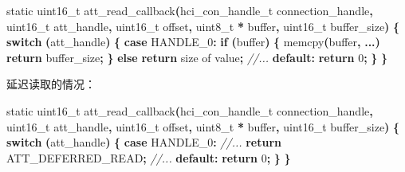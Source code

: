 \documentclass[
  12pt,
]{book}
\newenvironment{Shaded}{\begin{snugshade}}{\end{snugshade}}
\newcommand{\CommentTok}[1]{\textcolor[rgb]{0.56,0.35,0.01}{\textit{#1}}}
\newcommand{\ControlFlowTok}[1]{\textcolor[rgb]{0.13,0.29,0.53}{\textbf{#1}}}
\newcommand{\DataTypeTok}[1]{\textcolor[rgb]{0.13,0.29,0.53}{#1}}
\newcommand{\DecValTok}[1]{\textcolor[rgb]{0.00,0.00,0.81}{#1}}
\newcommand{\NormalTok}[1]{#1}
\newcommand{\OperatorTok}[1]{\textcolor[rgb]{0.81,0.36,0.00}{\textbf{#1}}}
\begin{document}
\begin{Shaded}
\begin{Highlighting}[]
\DataTypeTok{static} \DataTypeTok{uint16\_t}\NormalTok{ att\_read\_callback}\OperatorTok{(}\NormalTok{hci\_con\_handle\_t connection\_handle}\OperatorTok{,}
  \DataTypeTok{uint16\_t}\NormalTok{ att\_handle}\OperatorTok{,} \DataTypeTok{uint16\_t}\NormalTok{ offset}\OperatorTok{,}
  \DataTypeTok{uint8\_t} \OperatorTok{*}\NormalTok{ buffer}\OperatorTok{,} \DataTypeTok{uint16\_t}\NormalTok{ buffer\_size}\OperatorTok{)}
\OperatorTok{\{}
    \ControlFlowTok{switch} \OperatorTok{(}\NormalTok{att\_handle}\OperatorTok{)}
    \OperatorTok{\{}
    \ControlFlowTok{case}\NormalTok{ HANDLE\_0}\OperatorTok{:}
        \ControlFlowTok{if} \OperatorTok{(}\NormalTok{buffer}\OperatorTok{)}
        \OperatorTok{\{}
\NormalTok{            memcpy}\OperatorTok{(}\NormalTok{buffer}\OperatorTok{,} \OperatorTok{...)}
            \ControlFlowTok{return}\NormalTok{ buffer\_size}\OperatorTok{;}
        \OperatorTok{\}}
        \ControlFlowTok{else}
            \ControlFlowTok{return}\NormalTok{ size of value}\OperatorTok{;}
    \CommentTok{//...}
    \ControlFlowTok{default}\OperatorTok{:}
        \ControlFlowTok{return} \DecValTok{0}\OperatorTok{;}
    \OperatorTok{\}}
\OperatorTok{\}}
\end{Highlighting}
\end{Shaded}

延迟读取的情况：

\begin{Shaded}
\begin{Highlighting}[]
\DataTypeTok{static} \DataTypeTok{uint16\_t}\NormalTok{ att\_read\_callback}\OperatorTok{(}\NormalTok{hci\_con\_handle\_t connection\_handle}\OperatorTok{,}
  \DataTypeTok{uint16\_t}\NormalTok{ att\_handle}\OperatorTok{,} \DataTypeTok{uint16\_t}\NormalTok{ offset}\OperatorTok{,}
  \DataTypeTok{uint8\_t} \OperatorTok{*}\NormalTok{ buffer}\OperatorTok{,} \DataTypeTok{uint16\_t}\NormalTok{ buffer\_size}\OperatorTok{)}
\OperatorTok{\{}
    \ControlFlowTok{switch} \OperatorTok{(}\NormalTok{att\_handle}\OperatorTok{)}
    \OperatorTok{\{}
    \ControlFlowTok{case}\NormalTok{ HANDLE\_0}\OperatorTok{:}
        \CommentTok{//...}
        \ControlFlowTok{return}\NormalTok{ ATT\_DEFERRED\_READ}\OperatorTok{;}
    \CommentTok{//...}
    \ControlFlowTok{default}\OperatorTok{:}
        \ControlFlowTok{return} \DecValTok{0}\OperatorTok{;}
    \OperatorTok{\}}
\OperatorTok{\}}
\end{Highlighting}
\end{Shaded}
\end{document}

